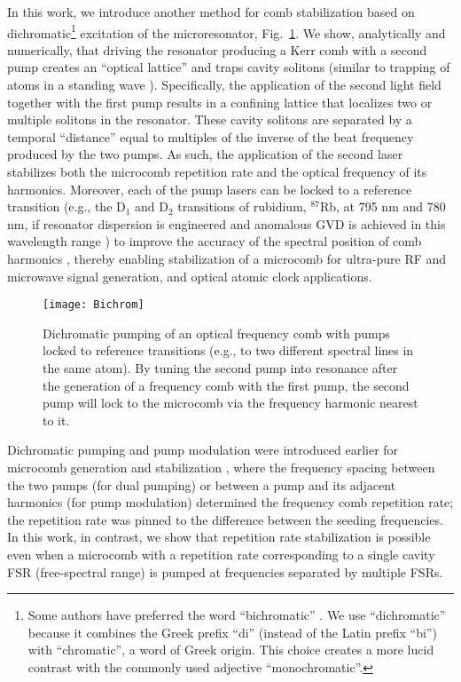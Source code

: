 In this work, we introduce another method for comb stabilization based on dichromatic\footnote{Some authors have preferred the word ``bichromatic'' \cite{strekalov2009generation, hansson2014bichromatically}. We use ``dichromatic'' because it combines the Greek prefix ``di'' (instead of the Latin prefix ``bi'') with ``chromatic'', a word of Greek origin. This choice creates a more lucid contrast with the commonly used adjective ``monochromatic''.} excitation of the microresonator, Fig.~\ref{fig:BCScheme}. We show, analytically and numerically, that driving the resonator producing a Kerr comb with a second pump creates an ``optical lattice'' and traps cavity solitons (similar to trapping of atoms in a standing wave \cite{letokhov1968narrowing, metcalf1999cooling}). Specifically, the application of the second light field together with the first pump results in a confining lattice that localizes two or multiple solitons in the resonator. These cavity solitons are separated by a temporal ``distance'' equal to multiples of the inverse of the beat frequency produced by the two pumps. As such, the application of the second laser stabilizes both the microcomb repetition rate and the optical frequency of its harmonics. Moreover, each of the pump lasers can be locked to a reference transition (e.g., the D$_1$ and D$_2$ transitions of rubidium, $^{87}$Rb, at 795 nm and 780 nm, if resonator dispersion is engineered and anomalous GVD is achieved in this wavelength range \cite{soltani2016arbitrary}) to improve the accuracy of the spectral position of comb harmonics \cite{savchenkov2013clock, papp2014clock}, thereby enabling  stabilization of a microcomb for ultra-pure RF and microwave signal generation, and optical atomic clock applications.
%
\begin{figure}[tbp]
  \centering
  \texttt{[image: Bichrom]}
\caption{ \small Dichromatic pumping of an optical frequency comb with pumps locked to reference transitions (e.g., to two different spectral lines in the same atom). By tuning the second pump into resonance after the generation of a frequency comb with the first pump, the second pump will lock to the microcomb via the frequency harmonic nearest to it. 
} \label{fig:BCScheme}
\end{figure}
%

Dichromatic pumping and pump modulation were introduced earlier for microcomb generation and stabilization \cite{strekalov2009generation, papp2013parametric, taheri2014threshold, taheri2015soliton, hansson2014bichromatically, lobanov2016harmonization}, where the frequency spacing between the two pumps (for dual pumping) or between a pump and its adjacent harmonics (for pump modulation) determined the frequency comb repetition rate; the repetition rate was pinned to the difference between the seeding frequencies. In this work, in contrast, we show that repetition rate stabilization is possible even when a microcomb with a repetition rate corresponding to a single cavity FSR (free-spectral range) is pumped at frequencies separated by multiple FSRs.

